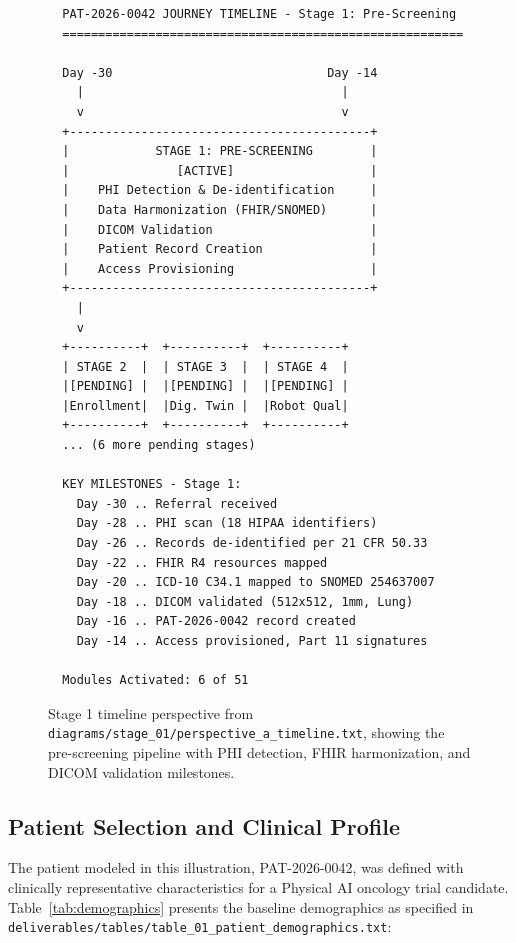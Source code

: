 \documentclass{article}
\begin{document}
\begin{figure}[H]
\begin{verbatim}
  PAT-2026-0042 JOURNEY TIMELINE - Stage 1: Pre-Screening
  ========================================================

  Day -30                              Day -14
    |                                    |
    v                                    v
  +------------------------------------------+
  |            STAGE 1: PRE-SCREENING        |
  |               [ACTIVE]                   |
  |    PHI Detection & De-identification     |
  |    Data Harmonization (FHIR/SNOMED)      |
  |    DICOM Validation                      |
  |    Patient Record Creation               |
  |    Access Provisioning                   |
  +------------------------------------------+
    |
    v
  +----------+  +----------+  +----------+
  | STAGE 2  |  | STAGE 3  |  | STAGE 4  |
  |[PENDING] |  |[PENDING] |  |[PENDING] |
  |Enrollment|  |Dig. Twin |  |Robot Qual|
  +----------+  +----------+  +----------+
  ... (6 more pending stages)

  KEY MILESTONES - Stage 1:
    Day -30 .. Referral received
    Day -28 .. PHI scan (18 HIPAA identifiers)
    Day -26 .. Records de-identified per 21 CFR 50.33
    Day -22 .. FHIR R4 resources mapped
    Day -20 .. ICD-10 C34.1 mapped to SNOMED 254637007
    Day -18 .. DICOM validated (512x512, 1mm, Lung)
    Day -16 .. PAT-2026-0042 record created
    Day -14 .. Access provisioned, Part 11 signatures

  Modules Activated: 6 of 51
\end{verbatim}
\caption{Stage 1 timeline perspective from \texttt{diagrams/stage\_01/perspective\_a\_timeline.txt}, showing the pre-screening pipeline with PHI detection, FHIR harmonization, and DICOM validation milestones.}
\label{fig:stage1-timeline}
\end{figure}

\subsection{Patient Selection and Clinical Profile}

The patient modeled in this illustration, PAT-2026-0042, was defined with clinically representative characteristics for a Physical AI oncology trial candidate. Table~\ref{tab:demographics} presents the baseline demographics as specified in \texttt{deliverables/tables/table\_01\_patient\_demographics.txt}:
\end{document}
